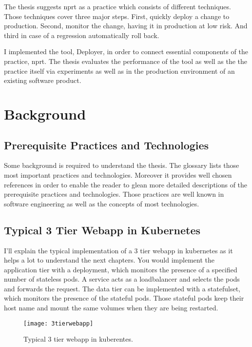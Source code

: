 The thesis suggests \gls{nprt} as a practice which consists of different techniques. Those
techniques cover three major steps. First, quickly deploy a change to production. Second,
monitor the change, having it in production at low risk. And third in case of a regression
automatically roll back.

I implemented the tool, Deployer, in order to connect essential components of the
practice, \gls{nprt}. The thesis evaluates the performance of the tool as well as the the
practice itself via experiments as well as in the production environment of an existing
software product.

\chapter{Background}
\label{chap:background}

\section{Prerequisite Practices and Technologies}

Some background is required to understand the thesis. The glossary lists those most
important practices and technologies. Moreover it provides well chosen references in order
to enable the reader to glean more detailed descriptions of the prerequisite practices and
technologies. Those practices are well known in software engineering as well as the
concepts of most technologies.

\section{Typical 3 Tier Webapp in Kubernetes}

I'll explain the typical implementation of a 3 tier webapp in kubernetes as it helps a lot
to understand the next chapters. You would implement the application tier with a
deployment, which monitors the presence of a specified number of stateless pods. A service
acts as a loadbalancer and selects the pods and forwards the request. The data tier can be
implemented with a statefulset, which monitors the presence of the stateful pods. Those
stateful pods keep their host name and mount the same volumes when they are being
restarted.

\begin{figure}[htbp]
  \centering
  \texttt{[image: 3tierwebapp]}
  \caption[3tierwebapp]{Typical 3 tier webapp in kuberentes.}
  \label{fig:3tierwebapp}
\end{figure}

